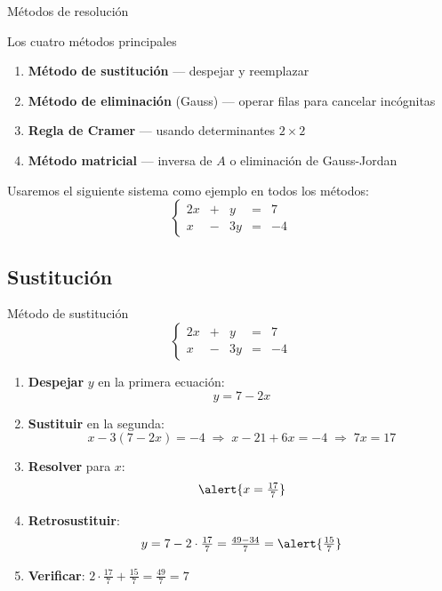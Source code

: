 \documentclass[11pt, aspectratio=169]{beamer}
\begin{document}
	\begin{frame}{Métodos de resolución}
		\begin{block}{Los cuatro métodos principales}
			\begin{enumerate}
				\item \textbf{Método de sustitución} — despejar y reemplazar
				\item \textbf{Método de eliminación} (Gauss) — operar filas para cancelar incógnitas
				\item \textbf{Regla de Cramer} — usando determinantes $2\times2$
				\item \textbf{Método matricial} — inversa de $A$ o eliminación de Gauss-Jordan
			\end{enumerate}
		\end{block}
		
		\vspace{0.5em}
		Usaremos el siguiente sistema como ejemplo en todos los métodos:
		\[
		\left\{
		\begin{array}{rcrcr}
			2x & + &  y & = & 7 \\[4pt]
			x & - & 3y & = & -4
		\end{array}
		\right.
		\]
	\end{frame}
	
	\subsection{Sustitución}
	
	\begin{frame}{Método de sustitución}
		\[
		\left\{
		\begin{array}{rcrcr}
			2x & + &  y & = & 7 \\[4pt]
			x & - & 3y & = & -4
		\end{array}
		\right.
		\]
		
		\begin{enumerate}
			\item<1-> \textbf{Despejar} $y$ en la primera ecuación:
			\[ y = 7 - 2x \]
			
			\item<2-> \textbf{Sustituir} en la segunda:
			\[ x - 3(7 - 2x) = -4 \;\Rightarrow\; x - 21 + 6x = -4
			\;\Rightarrow\; 7x = 17 \]
			
			\item<3-> \textbf{Resolver} para $x$:
			\[ \alert{x = \tfrac{17}{7}} \]
			
			\item<4-> \textbf{Retrosustituir}:
			\[ y = 7 - 2 \cdot \tfrac{17}{7} = \tfrac{49-34}{7} = \alert{\tfrac{15}{7}} \]
			
			\item<5-> \textbf{Verificar}: $2\cdot\tfrac{17}{7} + \tfrac{15}{7} = \tfrac{49}{7} = 7$ \checkmark
		\end{enumerate}
	\end{frame}
	
\end{document}
